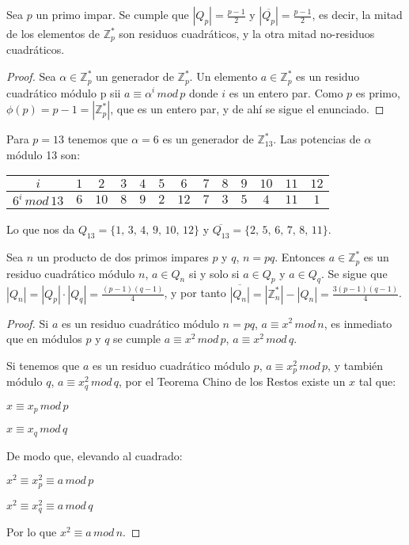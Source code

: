 \begin{proposition}
	Sea $p$ un primo impar. Se cumple que $|Q_p| = \frac{p-1}{2}$ y $|\overline{Q_p}| = \frac{p-1}{2}$, es decir, la mitad de los elementos de $\mathbb{Z}^*_p$ son residuos cuadráticos, y la otra mitad no-residuos cuadráticos.
\end{proposition}

\begin{proof}
	Sea $\alpha \in \mathbb{Z}^*_p$ un generador de $\mathbb{Z}^*_p$.
	Un elemento $a \in \mathbb{Z}^*_p$ es un residuo cuadrático módulo p sii $a \equiv \alpha^i \, mod \, p$ donde $i$ es un entero par. Como $p$ es primo, $\phi(p) = p-1 = |\mathbb{Z}^*_p|$, que es un entero par, y de ahí se sigue el enunciado.
\end{proof}

\begin{example}
	Para $p=13$ tenemos que $\alpha = 6$ es un generador de $\mathbb{Z}^*_{13}$. Las potencias de $\alpha$ módulo 13 son:
	
	\begin{tabular}{|c||c|c|c|c|c|c|c|c|c|c|c|c|}
		 \hline
			$i$ & $1$ & $2$ & $3$ & $4$ & $5$ & $6$ & $7$ & $8$ & $9$ & $10$ & $11$ & $12$ \\
			\hline
			$6^i \, mod \, 13$ & $6$ & $10$ & $8$ & $9$ & $2$ & $12$ & $7$ & $3$ & $5$ & $4$ & $11$ & $1$ \\
		 \hline
	\end{tabular}

	\hfil

	Lo que nos da $Q_{13} = \{1,\,3,\,4,\,9,\,10,\,12\}$ y $\overline{Q_{13}} = \{2,\,5,\,6,\,7,\,8,\,11\}$.
\end{example}

\begin{proposition}
	Sea $n$ un producto de dos primos impares $p$ y $q$, $n = pq$. Entonces  $a \in \mathbb{Z}^*_p$ es un residuo cuadrático módulo $n$, $a \in Q_n$ si y solo si $a \in Q_p$ y $a \in Q_q$. Se sigue que $|Q_n| = |Q_p|\cdot |Q_q| = \frac{(p-1)(q-1)}{4}$, y por tanto  $\overline{|Q_n|} = |\mathbb{Z}^*_n| - |Q_n| = \frac{3(p-1)(q-1)}{4}$.
\end{proposition}

\begin{proof}	
	Si $a$ es un residuo cuadrático módulo $n=pq$, $a \equiv x^2  \, mod \, n$, es inmediato que en módulos $p$ y $q$ se cumple $a \equiv x^2  \, mod \, p$, $a \equiv x^2  \, mod \, q$.
	
	Si tenemos que $a$ es un residuo cuadrático módulo $p$, $a \equiv x_p^2 \, mod \, p$, y también módulo $q$, $a \equiv x_q^2 \, mod \, q$, por el Teorema Chino de los Restos existe un $x$ tal que:
	
	$x \equiv x_p \, mod \, p$
	
	$x \equiv x_q \, mod \, q$
	
	De modo que, elevando al cuadrado:
	
	$x^2 \equiv x_p^2 \equiv a \, mod \, p$
	
	$x^2 \equiv x_q^2 \equiv a \, mod \, q$
	
	Por lo que $x^2 \equiv a \, mod \, n$.
	
\end{proof}




